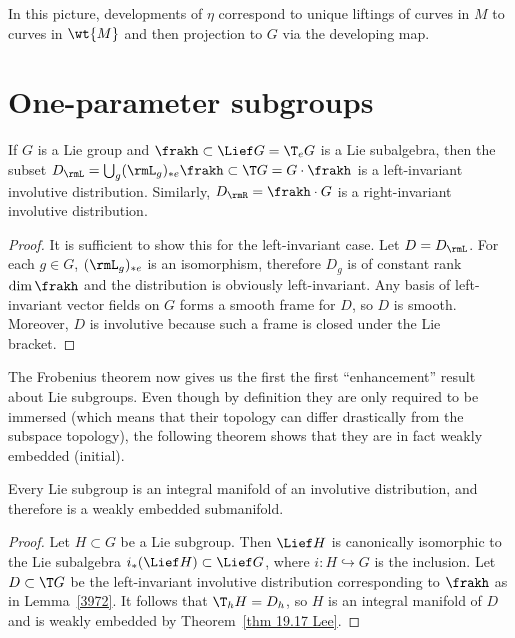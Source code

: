 In this picture, developments of $\eta$ correspond to unique liftings of curves in $M$ to curves in $\wt{M}$ and then projection to $G$ via the developing map.






\section{One-parameter subgroups}


\begin{lem}\label{3972}
    If $G$ is a Lie group and $\frakh\subset \Lief G=\T_e G$ is a Lie subalgebra, then the subset $D_\rmL=\bigcup_g (\rmL_g)_{\ast e}\frakh\subset \T G=G\cdot \frakh$ is a left-invariant involutive distribution. Similarly, $D_\rmR=\frakh\cdot G$ is a right-invariant involutive distribution. 
\end{lem}
\begin{proof}
    It is sufficient to show this for the left-invariant case. Let $D=D_\rmL$. For each $g\in G$, $(\rmL_g)_{\ast e}$ is an isomorphism, therefore $D_g$ is of constant rank $\dim \frakh$ and the distribution is obviously left-invariant. Any basis of left-invariant vector fields on $G$ forms a smooth frame for $D$, so $D$ is smooth. Moreover, $D$ is involutive because such a frame is closed under the Lie bracket.
\end{proof}

The Frobenius theorem now gives us the first the first ``enhancement'' result about Lie subgroups. Even though by definition they are only required to be immersed (which means that their topology can differ drastically from the subspace topology), the following theorem shows that they are in fact weakly embedded (initial).

\begin{thm}\label{thm 19.25 Lee}
    Every Lie subgroup is an integral manifold of an involutive distribution, and therefore is a weakly embedded submanifold.
\end{thm}
\begin{proof}
    Let $H\subset G$ be a Lie subgroup. Then $\Lief H$ is canonically isomorphic to the Lie subalgebra $i_\ast(\Lief H)\subset \Lief G$, where $i:H\hookrightarrow G$ is the inclusion. Let $D\subset \T G$ be the left-invariant involutive distribution corresponding to $\frakh$ as in Lemma~\ref{3972}. It follows that $\T_hH=D_h$, so $H$ is an integral manifold of $D$ and is weakly embedded by Theorem~\ref{thm 19.17 Lee}.
\end{proof}

